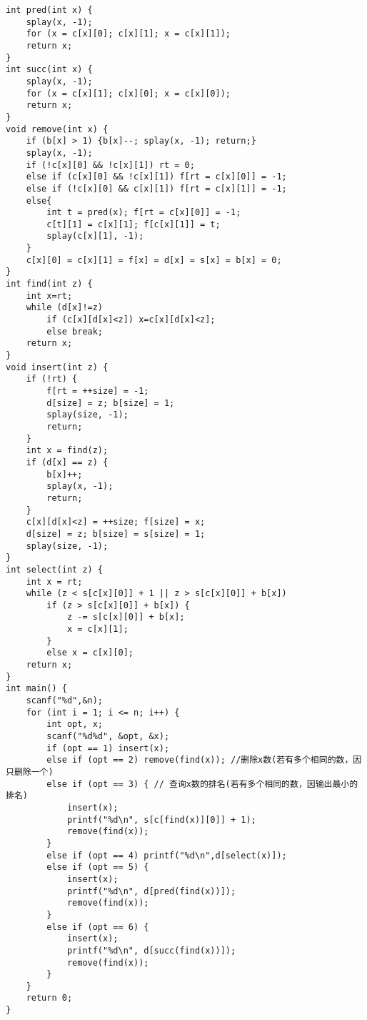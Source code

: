 \begin{lstlisting}
int pred(int x) {
	splay(x, -1);
	for (x = c[x][0]; c[x][1]; x = c[x][1]);
	return x;
}
int succ(int x) {
	splay(x, -1);
	for (x = c[x][1]; c[x][0]; x = c[x][0]);
	return x;
}
void remove(int x) {
	if (b[x] > 1) {b[x]--; splay(x, -1); return;}
	splay(x, -1);
	if (!c[x][0] && !c[x][1]) rt = 0;
	else if (c[x][0] && !c[x][1]) f[rt = c[x][0]] = -1;
	else if (!c[x][0] && c[x][1]) f[rt = c[x][1]] = -1;
	else{
		int t = pred(x); f[rt = c[x][0]] = -1;
		c[t][1] = c[x][1]; f[c[x][1]] = t;
		splay(c[x][1], -1);
	}
	c[x][0] = c[x][1] = f[x] = d[x] = s[x] = b[x] = 0;
}
int find(int z) {
	int x=rt;
	while (d[x]!=z)
		if (c[x][d[x]<z]) x=c[x][d[x]<z];
		else break;
	return x;
}
void insert(int z) {
	if (!rt) {
		f[rt = ++size] = -1;
		d[size] = z; b[size] = 1;
		splay(size, -1);
		return;
	}
	int x = find(z);
	if (d[x] == z) {
		b[x]++;
		splay(x, -1);
		return;
	}
	c[x][d[x]<z] = ++size; f[size] = x;
	d[size] = z; b[size] = s[size] = 1;
	splay(size, -1);
}
int select(int z) {
	int x = rt;
	while (z < s[c[x][0]] + 1 || z > s[c[x][0]] + b[x])
		if (z > s[c[x][0]] + b[x]) {
			z -= s[c[x][0]] + b[x];
			x = c[x][1];
		}
	  	else x = c[x][0];
	return x;
}
int main() {
	scanf("%d",&n);
	for (int i = 1; i <= n; i++) {
		int opt, x;
		scanf("%d%d", &opt, &x);
		if (opt == 1) insert(x);
		else if (opt == 2) remove(find(x)); //删除x数(若有多个相同的数，因只删除一个)
		else if (opt == 3) { // 查询x数的排名(若有多个相同的数，因输出最小的排名)
			insert(x);
			printf("%d\n", s[c[find(x)][0]] + 1);
			remove(find(x));
		}
		else if (opt == 4) printf("%d\n",d[select(x)]);
		else if (opt == 5) {
			insert(x);
			printf("%d\n", d[pred(find(x))]);
			remove(find(x));
		}
		else if (opt == 6) {
			insert(x);
			printf("%d\n", d[succ(find(x))]);
			remove(find(x));
		}
	}
	return 0;
}
\end{lstlisting}
